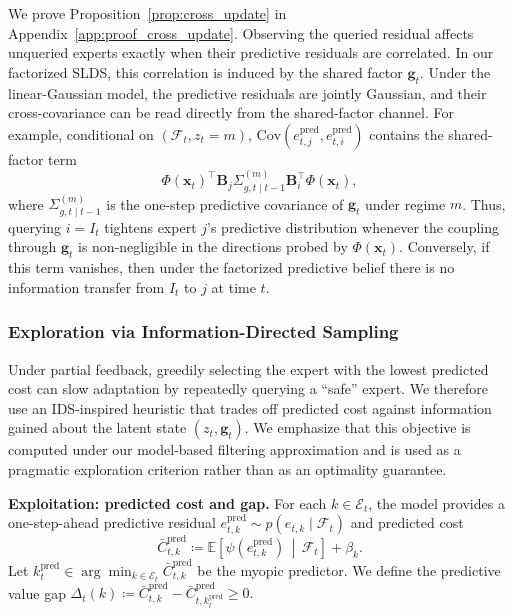 We prove Proposition~\ref{prop:cross_update} in Appendix~\ref{app:proof_cross_update}. Observing the queried
residual affects unqueried experts exactly when their predictive
residuals are correlated. In our factorized SLDS, this correlation is induced by the shared factor
\(\mathbf{g}_t\). Under the linear-Gaussian model, the predictive residuals are jointly Gaussian, and
their cross-covariance can be read directly from the shared-factor channel. For example, conditional on
\((\mathcal{F}_t,z_t=m)\),
\(\mathrm{Cov}(e_{t,j}^{\mathrm{pred}},e_{t,i}^{\mathrm{pred}})\) contains the shared-factor term
\[
\Phi(\mathbf{x}_t)^\top \mathbf{B}_j \Sigma^{(m)}_{g,t\mid t-1}\mathbf{B}_{i}^\top \Phi(\mathbf{x}_t),
\]
where \(\Sigma^{(m)}_{g,t\mid t-1}\) is the one-step predictive covariance of \(\mathbf{g}_t\)
under regime \(m\). Thus, querying \(i=I_t\) tightens expert \(j\)'s predictive distribution whenever
the coupling through \(\mathbf{g}_t\) is non-negligible in the directions probed by \(\Phi(\mathbf{x}_t)\).
Conversely, if this term vanishes, then under the
factorized predictive belief there is no information transfer from \(I_t\) to \(j\) at time \(t\).

\subsubsection{Exploration via Information-Directed Sampling}
\label{sec:exploration}

Under partial feedback, greedily selecting the expert with the lowest predicted cost can slow
adaptation by repeatedly querying a ``safe'' expert. We therefore use an IDS-inspired heuristic
\citep{russo2014learning} that trades off predicted cost against information gained about the latent
state \((z_t,\mathbf{g}_t)\). We emphasize that this objective is computed under our model-based
filtering approximation and is used as a pragmatic exploration criterion rather than as an
optimality guarantee.

\textbf{Exploitation: predicted cost and gap.}
For each \(k\in\mathcal{E}_t\), the model provides a one-step-ahead predictive residual
\(e_{t,k}^{\mathrm{pred}}\sim p(e_{t,k}\mid\mathcal{F}_t)\) and predicted cost
\[
\bar C_{t,k}^{\mathrm{pred}}
\coloneqq
\mathbb{E}\!\left[\psi(e_{t,k}^{\mathrm{pred}})\,\middle|\,\mathcal{F}_t\right]+\beta_k.
\]
Let \(k_t^{\mathrm{pred}} \in \arg\min_{k\in\mathcal{E}_t} \bar C_{t,k}^{\mathrm{pred}}\) be the myopic
predictor. We define the predictive value gap $\Delta_t(k)
\coloneqq
\bar C_{t,k}^{\mathrm{pred}}-\bar C_{t,k_t^{\mathrm{pred}}}^{\mathrm{pred}}
\ge 0.$

